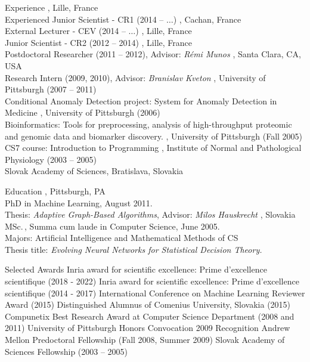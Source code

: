 \documentclass{resume}
\begin{document}
\begin{category}{Experience}
, Lille, France \\
Experienced Junior Scientist - CR1 (2014 -- $\dots$)
, Cachan, France \\
External Lecturer - CEV (2014 -- $\dots$)
, Lille, France \\
Junior Scientist - CR2 (2012 -- 2014)
, Lille, France \\
Postdoctoral Researcher (2011 -- 2012), Advisor:  \emph{R\'emi Munos}
,  Santa Clara, CA, USA\\
Research Intern (2009, 2010), Advisor:  \emph{Branislav Kveton}
, University of Pittsburgh (2007 -- 2011)\\
Conditional Anomaly Detection project: System for Anomaly Detection in Medicine
, University of Pittsburgh (2006)\\
Bioinformatics: Tools for preprocessing, analysis of high-throughput proteomic and genomic data and biomarker discovery.
, University of Pittsburgh (Fall 2005)\\ 
CS7 course: Introduction to Programming 
, Institute of Normal and Pathological Physiology (2003 -- 2005)\\
Slovak Academy of Sciences, Bratislava, Slovakia
\end{category}
\begin{category}{Education}
, Pittsburgh, PA \\ %
PhD in Machine Learning, August 2011.\\
Thesis: \emph{Adaptive Graph-Based Algorithms}, Advisor: \emph{Milos Hauskrecht}
, Slovakia\\%
MSc.\,, Summa cum laude in Computer Science, June 2005.\\
Majors: Artificial Intelligence  and Mathematical Methods of CS\\ %
Thesis title: \emph{Evolving Neural Networks for Statistical Decision Theory.}
\end{category}
\begin{category}{Selected Awards}
	\citemnobullet Inria award for scientific excellence:
Prime d'excellence scientifique (2018 - 2022)
	\citemnobullet Inria award for scientific excellence:
Prime d'excellence scientifique (2014 - 2017)
\citemnobullet International Conference on Machine Learning Reviewer Award (2015)
\citemnobullet Distinguished Alumnus of Comenius University, Slovakia (2015)
	\citemnobullet Compunetix Best Research Award at Computer Science 
Department (2008 and 2011)	
	\citemnobullet University of Pittsburgh Honors Convocation 2009 
Recognition 
       \citemnobullet Andrew Mellon Predoctoral Fellowship (Fall 2008, Summer 
2009)	
       \citemnobullet Slovak Academy of Sciences Fellowship (2003 -- 2005)

\end{category}
\end{document}
